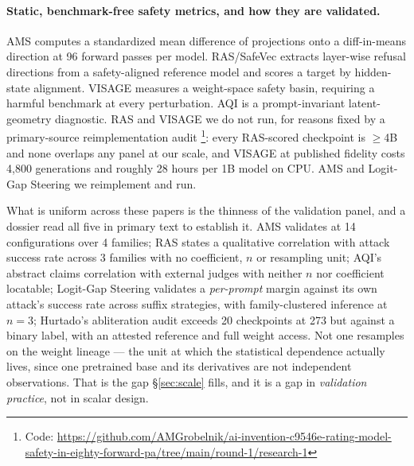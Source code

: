 \documentclass[11pt,letterpaper]{article}
\begin{document}
\paragraph{Static, benchmark-free safety metrics, and how they are validated.} AMS \citep{Messenger2026} computes a standardized mean difference of projections onto a diff-in-means direction at 96 forward passes per model. RAS/SafeVec \citep{Huang2026} extracts layer-wise refusal directions from a safety-aligned reference model and scores a target by hidden-state alignment. VISAGE \citep{Peng2024} measures a weight-space safety basin, requiring a harmful benchmark at every perturbation. AQI \citep{Borah2025} is a prompt-invariant latent-geometry diagnostic. RAS and VISAGE we do not run, for reasons fixed by a primary-source reimplementation audit \footnote{Code: \url{https://github.com/AMGrobelnik/ai-invention-c9546e-rating-model-safety-in-eighty-forward-pa/tree/main/round-1/research-1}}: every RAS-scored checkpoint is $\geq$4B and none overlaps any panel at our scale, and VISAGE at published fidelity costs 4,800 generations and roughly 28 hours per 1B model on CPU. AMS and Logit-Gap Steering \citep{LiLiu2025} we reimplement and run.

What is uniform across these papers is the thinness of the validation panel, and a dossier read all five in primary text to establish it. AMS validates at 14 configurations over 4 families; RAS states a qualitative correlation with attack success rate across 3 families with no coefficient, $n$ or resampling unit; AQI's abstract claims correlation with external judges with neither $n$ nor coefficient locatable; Logit-Gap Steering validates a \emph{per-prompt} margin against its own attack's success rate across suffix strategies, with family-clustered inference at $n = 3$; Hurtado's abliteration audit \citep{Hurtado2026} exceeds 20 checkpoints at 273 but against a binary label, with an attested reference and full weight access. Not one resamples on the weight lineage --- the unit at which the statistical dependence actually lives, since one pretrained base and its derivatives are not independent observations. That is the gap \S\ref{sec:scale} fills, and it is a gap in \emph{validation practice}, not in scalar design.
\end{document}
